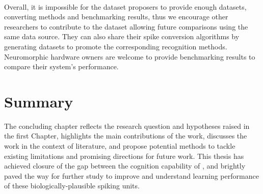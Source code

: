 \DIFaddbegin \paragraph{}
\DIFaddend Overall, it is impossible for the dataset proposers to provide enough datasets, converting methods and benchmarking results, thus we encourage other researchers to contribute to the dataset allowing future comparisons using the same data source.
They can also share their spike conversion algorithms by generating datasets to promote the corresponding recognition methods.
Neuromorphic hardware owners are welcome to provide benchmarking results to compare their system's performance.
\section{Summary}

The concluding chapter reflects the research question and hypotheses raised in the first Chapter, highlights the main contributions of the work, discusses the work in the context of literature, and propose potential methods to tackle existing limitations and promising directions for future work.
This thesis has achieved closure of the gap between the cognition capability of \DIFdelbegin {}\DIFdelend \DIFaddbegin {}\DIFaddend , and brightly paved the way for further study to improve and understand \DIFaddbegin {}\DIFaddend learning performance of these biologically-plausible spiking units.